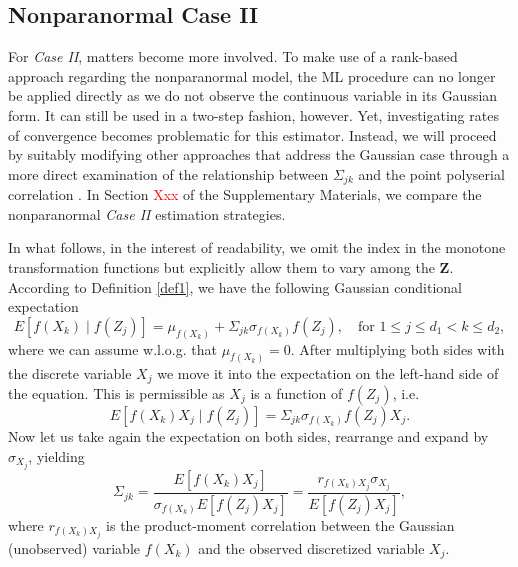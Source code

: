 \subsection{Nonparanormal Case II}\label{sec::nonparanormal_case2}

For \textit{Case II}, matters become more involved. To make use of a rank-based approach regarding the nonparanormal model, the ML procedure can no longer be applied directly as we do not observe the continuous variable in its Gaussian form. It can still be used in a two-step fashion, however. Yet, investigating rates of convergence becomes problematic for this estimator. Instead, we will proceed by suitably modifying other approaches that address the Gaussian case through a more direct examination of the relationship between $\Sigma_{jk}$ and the point polyserial correlation \citep{Bedrick92, Bedrick96}.
In Section \textcolor{red}{Xxx} of the Supplementary Materials, we compare the nonparanormal \textit{Case II} estimation strategies.

In what follows, in the interest of readability, we omit the index in the monotone transformation functions but explicitly allow them to vary among the $\mathbf{Z}$. According to Definition \ref{def1}, we have the following Gaussian conditional expectation
\begin{equation}
    E[f(X_k) \mid f(Z_j)] = \mu_{f(X_k)} + \Sigma_{jk}\sigma_{f(X_k)} f(Z_j), \quad \text{for } 1 \leq j \leq d_1 < k \leq d_2,
\end{equation}
where we can assume w.l.o.g. that $\mu_{f(X_k)} = 0$. After multiplying both sides with the discrete variable $X_j$ we move it into the expectation on the left-hand side of the equation. This is permissible as $X_j$ is a function of $f(Z_j)$, i.e.
\begin{equation*}
    E[f(X_k)X_j \mid f(Z_j)] = \Sigma_{jk}\sigma_{f(X_k)} f(Z_j)X_j.
\end{equation*}
Now let us take again the expectation on both sides, rearrange and expand by $\sigma_{X_j}$, yielding
\begin{equation}\label{population_polyserial_nonpara}
        \Sigma_{jk} = \frac{E[f(X_k)X_j]}{\sigma_{f(X_k)} E[f(Z_j)X_j]} = \frac{r_{f(X_k)X_j}\sigma_{X_j}}{E[f(Z_j)X_j]},
\end{equation}
where $r_{f(X_k)X_j}$ is the product-moment correlation between the Gaussian (unobserved) variable $f(X_k)$ and the observed discretized variable $X_j$.

